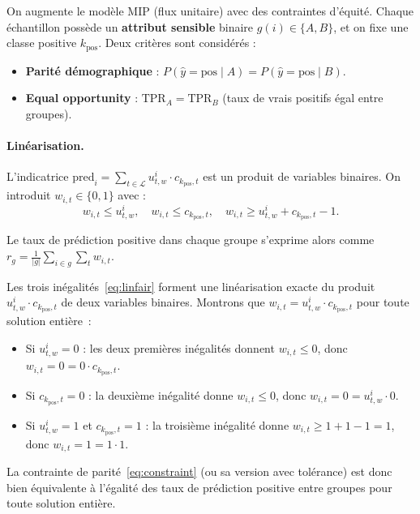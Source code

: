 \documentclass[a4paper,10pt,titlepage,leqno]{article}
\begin{document}
On augmente le modèle MIP (flux unitaire) avec des contraintes d'équité. Chaque échantillon possède un \textbf{attribut sensible} binaire $g(i) \in \{A, B\}$, et on fixe une classe positive $k_{\text{pos}}$. Deux critères sont considérés :

\begin{itemize}
  \item \textbf{Parité démographique} : $P(\hat{y}{=}\text{pos} \mid A) = P(\hat{y}{=}\text{pos} \mid B)$.
  \item \textbf{Equal opportunity} : $\text{TPR}_A = \text{TPR}_B$ (taux de vrais positifs égal entre groupes).
\end{itemize}

\paragraph{Linéarisation.} L'indicatrice $\text{pred}_i = \sum_{t \in \mathcal{L}} u^i_{t,w} \cdot c_{k_{\text{pos}}, t}$ est un produit de variables binaires. On introduit $w_{i,t} \in \{0,1\}$ avec :
\begin{equation}
w_{i,t} \leq u^i_{t,w}, \quad w_{i,t} \leq c_{k_{\text{pos}}, t}, \quad w_{i,t} \geq u^i_{t,w} + c_{k_{\text{pos}}, t} - 1.
\label{eq:linfair}
\end{equation}

Le taux de prédiction positive dans chaque groupe s'exprime alors comme $r_g = \frac{1}{|g|} \sum_{i \in g} \sum_t w_{i,t}$.

\begin{theorybox}

Les trois inégalités~\eqref{eq:linfair} forment une linéarisation exacte du produit $u^i_{t,w} \cdot c_{k_{\text{pos}}, t}$ de deux variables binaires. Montrons que $w_{i,t} = u^i_{t,w} \cdot c_{k_{\text{pos}}, t}$ pour toute solution entière~:

\begin{itemize}
  \item Si $u^i_{t,w} = 0$ : les deux premières inégalités donnent $w_{i,t} \leq 0$, donc $w_{i,t} = 0 = 0 \cdot c_{k_{\text{pos}}, t}$.
  \item Si $c_{k_{\text{pos}}, t} = 0$ : la deuxième inégalité donne $w_{i,t} \leq 0$, donc $w_{i,t} = 0 = u^i_{t,w} \cdot 0$.
  \item Si $u^i_{t,w} = 1$ et $c_{k_{\text{pos}}, t} = 1$ : la troisième inégalité donne $w_{i,t} \geq 1 + 1 - 1 = 1$, donc $w_{i,t} = 1 = 1 \cdot 1$.
\end{itemize}

La contrainte de parité~\eqref{eq:constraint} (ou sa version avec tolérance) est donc bien équivalente à l'égalité des taux de prédiction positive entre groupes pour toute solution entière.
\end{theorybox}
\end{document}
